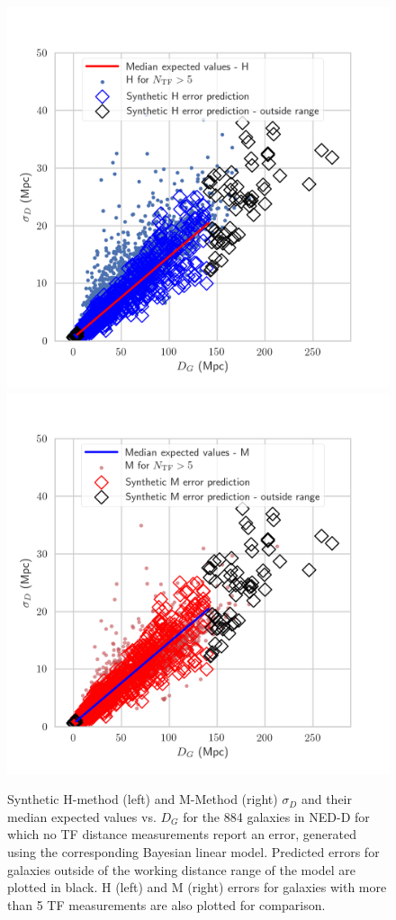 \documentclass[a4paper,fleqn,usenatbib]{mnras}
\begin{document}
\begin{figure}
	\includegraphics[scale=0.69]{predl1.png}
	\includegraphics[scale=0.69]{predl2.png}
    \caption{Synthetic H-method (left) and M-Method (right) $\sigma_D$ and their median expected values vs. $D_G$ for the 884 galaxies in NED-D for which no TF distance measurements report an error, generated using the corresponding Bayesian linear model. Predicted errors for galaxies outside of the working distance range of the model are plotted in black. H (left) and M (right) errors for galaxies with more than 5 TF measurements are also plotted for comparison.}
    \label{fig:predl1}
\end{figure}
\end{document}
